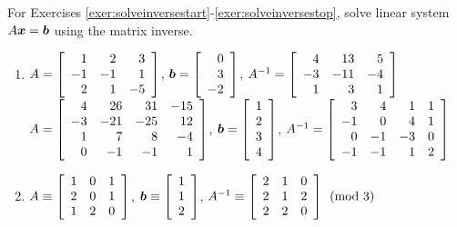 \noindent For Exercises \ref{exer:solveinversestart}-\ref{exer:solveinversestop}, solve linear system $A\bb x = \bb b$ using the matrix inverse. 
\begin{enumerate}[!HW!, label=$\spadesuit$ \arabic*., ref=\arabic*]
\item\label{exer:solveinversestart} $A = \mtx{rrr}{1&2&3\\-1&-1&1\\2&1&-5}$, $\bb b = \vr{0\\3\\-2}$, $A^{-1} = \mtx{rrr}{4&13&5\\-3&-11&-4\\1&3&1}$
\itemspade $A = \mtx{rrrr}{4&26&31&-15\\-3&-21&-25&12\\1&7&8&-4\\0&-1&-1&1}$, $\bb b = \vr{1\\2\\3\\4}$, $A^{-1} = \mtx{rrrr}{3&4&1&1\\-1&0&4&1\\0&-1&-3&0\\-1&-1&1&2}$
\item \label{exer:solveinversestop} $A \equiv \mtx{rrr}{1&0&1\\2&0&1\\1&2&0}$, $\bb b \equiv \vr{1\\1\\2}$, $A^{-1} \equiv \mtx{rrr}{2&1&0\\2&1&2\\2&2&0}\pmod 3$ 
\end{enumerate}

